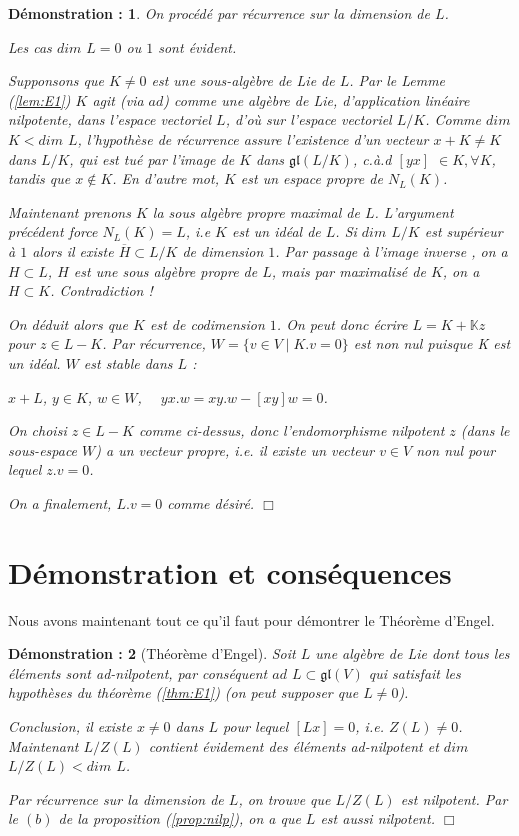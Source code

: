 \documentclass[a4paper,openany,12pt]{report}
\newcommand{\KK}{\mathbb{K}}
\newcommand{\gl}{\mathfrak{gl}}
\theoremstyle{break}
{\theorembodyfont{\upshape}
\newtheorem*{rmq}{Remarque :}
\newtheorem*{prv}{Preuve :}
\newtheorem*{ex}{Exemples :}
\newtheorem{exe}{Exemple : }
\newtheorem*{nota}{Notation :}}
\newtheorem*{dem}{D\'emonstration :}
\begin{document}
\begin{dem}
\quad On procédé par récurrence sur la dimension de $L$.

Les cas $dim$ $L = 0$ ou $1$ sont évident.

Supponsons que $K \neq 0$ est une sous-algèbre de Lie de $L$. Par le Lemme (\ref{lem:E1}) $K$ agit (via $ad$) comme une algèbre de Lie, d'application linéaire nilpotente, dans l'espace vectoriel $L$, d'où sur l'espace vectoriel $L/K$. Comme $dim$ $K < dim$ $L$, l'hypothèse de récurrence assure l’existence d'un vecteur $x + K \neq K $ dans $L/K$, qui est tué par l'image de $K$ dans $\gl(L/K)$, c.à.d $[yx]$ $\in K, \forall K$, tandis que $x \notin K$. En d'autre mot, $K$ est un espace propre de $N_{L}(K)$.

Maintenant prenons $K$ la sous algèbre propre maximal de $L$. L'argument précédent force $N_{L}(K) = L$, i.e $K$ est un idéal de $L$. Si $dim$ $L/K$ est supérieur à $1$ alors il existe $\overline{H} \subset L/K$ de dimension $1$. Par passage à l'image inverse , on a $H \subset L$, $H$ est une sous algèbre propre de $L$, mais par maximalisé de $K$, on a $H \subset K$. Contradiction !

On déduit alors que $K$ est de codimension $1$. On peut donc écrire $L=K+ \KK z$ pour $z \in L-K$.
Par récurrence, $W = \{ v \in V \mid K.v = 0\}$ est non nul puisque K est un idéal. $W$ est stable dans $L$ : 
\begin{center}
$x+L$, $y \in K$, $w \in W$, $\quad yx.w = xy.w - [xy]w =0$.
\end{center}
\quad On choisi $z \in L-K$ comme ci-dessus, donc l'endomorphisme nilpotent $z$ (dans le sous-espace $W$) a un vecteur propre, i.e. il existe un vecteur $v \in V$ non nul pour lequel $z.v = 0$.

On a finalement, $L.v = 0$ comme désiré. $\Box$
\end{dem}

\section{Démonstration et conséquences}

Nous avons maintenant tout ce qu'il faut pour démontrer le Théorème d'Engel.

\begin{dem}[Théorème d'Engel]
\quad Soit $L$ une algèbre de Lie dont tous les éléments sont ad-nilpotent, par conséquent $ad$ $L \subset \gl(V)$ qui satisfait les hypothèses du théorème (\ref{thm:E1}) (on peut supposer que $L \neq 0$).

Conclusion, il existe $x \neq 0$ dans $L$ pour lequel $[Lx]=0$, i.e. $Z(L) \neq 0$. Maintenant $L/Z(L)$ contient évidement des éléments ad-nilpotent et $dim$ $L/Z(L) < dim$ $L$.

Par récurrence sur la dimension de $L$, on  trouve que $L/Z(L)$ est nilpotent. Par le $(b)$ de la proposition (\ref{prop:nilp}), on a que $L$ est aussi nilpotent. $\Box$
\end{dem}
\end{document}
